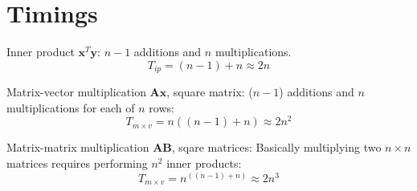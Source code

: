 
\section{Timings} %
\label{sec:timings}

Inner product $\mathbf{x}^T \mathbf{y}$: $n-1$ additions and $n$ multiplications.
\begin{equation}
  T_{ip} = (n-1) + n \approx 2n
\end{equation}

Matrix-vector multiplication $\mathbf{Ax}$, square matrix: ($n-1$) additions and $n$ multiplications for each of $n$ rows:
\begin{equation}
  T_{m\times v} = n((n-1)+n) \approx 2n^2
\end{equation}

Matrix-matrix multiplication $\mathbf{AB}$, sqare matrices: Basically multiplying two $n\times n$ matrices requires performing $n^2$ inner products:
\begin{equation}
  T_{m\times v} = n^((n-1) + n) \approx 2n^3
\end{equation}

